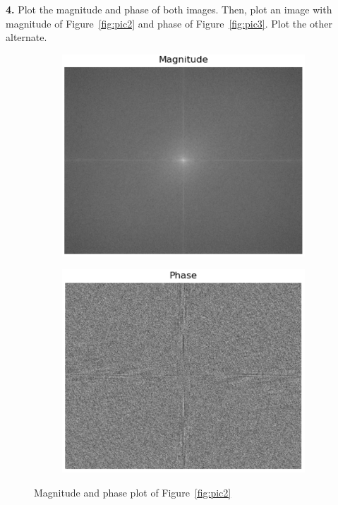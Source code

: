 \documentclass[hidelinks,12pt]{article}
\begin{document}
	
	 \textbf{4.} Plot the magnitude and phase of both images. Then, plot an image with magnitude of Figure~\ref{fig:pic2} and phase of Figure~\ref{fig:pic3}. Plot the other alternate.
	
	\begin{figure}[h!]
		\centering
		\begin{subfigure}[b]{0.45\textwidth}
			\centering
			\includegraphics[width=\textwidth]{figures/pic2_mag.PNG}
		\end{subfigure}
		\hspace{0.5cm}
		\begin{subfigure}[b]{0.45\textwidth}
			\centering
			\includegraphics[width=\textwidth]{figures/pic2_phase.PNG}
		\end{subfigure}
		\caption{Magnitude and phase plot of Figure~\ref{fig:pic2}}
	\end{figure}
	
\end{document}
